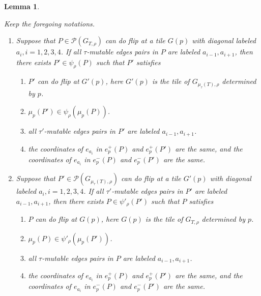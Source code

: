 \documentclass[10pt]{amsart}
\theoremstyle{theorems}
\newtheorem{Lemma}[Theorem]{Lemma}
\begin{document}
\begin{Lemma}\label{com}

Keep the foregoing notations.

\begin{enumerate}[$(1)$]

  \item Suppose that $P\in \mathcal P(G_{T,\rho})$ can do flip at a tile $G(p)$ with diagonal labeled $a_i,i=1,2,3,4$. If all $\tau$-mutable edges pairs in $P$ are labeled $a_{i-1},a_{i+1}$, then there exists $P'\in \psi_{\rho}(P)$ such that $P'$ satisfies

       \begin{enumerate}[$(a)$]

         \item $P'$ can do flip at $G'(p)$, here $G'(p)$ is the tile of $G_{\mu_{\tau}(T),\rho}$ determined by $p$.

         \item $\mu_p(P')\in \psi_{\rho}(\mu_{p}(P))$.

         \item all $\tau'$-mutable edges pairs in $P'$ are labeled $a_{i-1}, a_{i+1}$.

         \item the coordinates of $e_{a_i}$ in  $e_p^{+}(P)$ and $e_p^{+}(P')$ are the same, and the coordinates of $e_{a_i}$ in  $e_p^{-}(P)$ and $e_p^{-}(P')$ are the same.

       \end{enumerate}

  \item Suppose that $P'\in \mathcal P(G_{\mu_{\tau}(T),\rho})$ can do flip at a tile $G'(p)$ with diagonal labeled $a_i,i=1,2,3,4$. If all $\tau'$-mutable edges pairs in $P'$ are labeled $a_{i-1},a_{i+1}$, then there exists $P\in \psi'_{\rho}(P')$ such that $P$ satisfies

      \begin{enumerate}[$(a)$]

         \item $P$ can do flip at $G(p)$, here $G(p)$ is the tile of $G_{T,\rho}$ determined by $p$.

         \item $\mu_p(P)\in \psi'_{\rho}(\mu_{p}(P'))$.

         \item all $\tau$-mutable edges pairs in $P$ are labeled $a_{i-1}, a_{i+1}$.

         \item the coordinates of $e_{a_i}$ in  $e_p^{+}(P)$ and $e_p^{+}(P')$ are the same, and the coordinates of $e_{a_i}$ in  $e_p^{-}(P)$ and $e_p^{-}(P')$ are the same.

       \end{enumerate}

\end{enumerate}

\end{Lemma}
\end{document}
